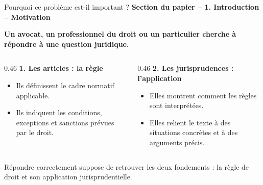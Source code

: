 \documentclass[aspectratio=169,10pt]{beamer}
\newcommand{\keybox}[1]{%
  \begin{center}
  \colorbox{accentsoft}{\parbox{0.92\linewidth}{\centering #1}}
  \end{center}}
\newcommand{\papersection}[1]{%
  {\scriptsize\textcolor{accent}{\textbf{Section du papier -- #1}}}\par\vspace{0.55em}}
\begin{document}
\begin{frame}{Pourquoi ce problème est-il important ?}
  \papersection{1. Introduction -- Motivation}
  \footnotesize
  \textbf{Un avocat, un professionnel du droit ou un particulier cherche à répondre à une question juridique.}

  \vspace{0.65em}
  \begin{columns}[T,onlytextwidth]
    \begin{column}{0.46\textwidth}
      \textbf{\color{accent}1. Les articles : la règle}
      \begin{itemize}\setlength{\itemsep}{0.38em}
        \item Ils définissent le cadre normatif applicable.
        \item Ils indiquent les conditions, exceptions et sanctions prévues par le droit.
      \end{itemize}
    \end{column}
    \begin{column}{0.46\textwidth}
      \textbf{\color{ok}2. Les jurisprudences : l'application}
      \begin{itemize}\setlength{\itemsep}{0.38em}
        \item Elles montrent comment les règles sont interprétées.
        \item Elles relient le texte à des situations concrètes et à des arguments précis.
      \end{itemize}
    \end{column}
  \end{columns}

  \vspace{0.85em}
  \keybox{\scriptsize Répondre correctement suppose de retrouver les deux fondements :
  la règle de droit et son application jurisprudentielle.}
\end{frame}
\end{document}
